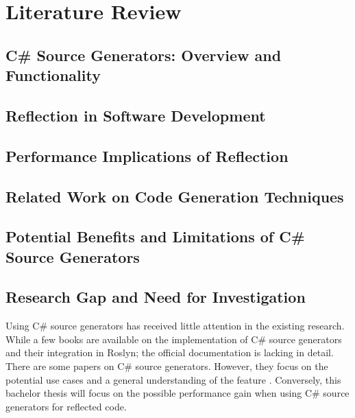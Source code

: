 \chapter{Literature Review}

\section{C\# Source Generators: Overview and Functionality}

\section{Reflection in Software Development}

\section{Performance Implications of Reflection}

\section{Related Work on Code Generation Techniques}

\section{Potential Benefits and Limitations of C\# Source Generators}

\section{Research Gap and Need for Investigation}

Using C\# source generators has received little attention in the existing research. While a few books \cite{Franz2022TrendsCompilerbau, Microsoft2022SourceGenerators, Vermeir2022.NETPlatform} are available on the implementation of C\# source generators and their integration in Roslyn; the official documentation \cite{Microsoft2022SourceGenerators} is lacking in detail. There are some papers on C\# source generators. However, they focus on the potential use cases and a general understanding of the feature \cite{Slimak2022SourceSLIMAK}. Conversely, this bachelor thesis will focus on the possible performance gain when using C\# source generators for reflected code.

